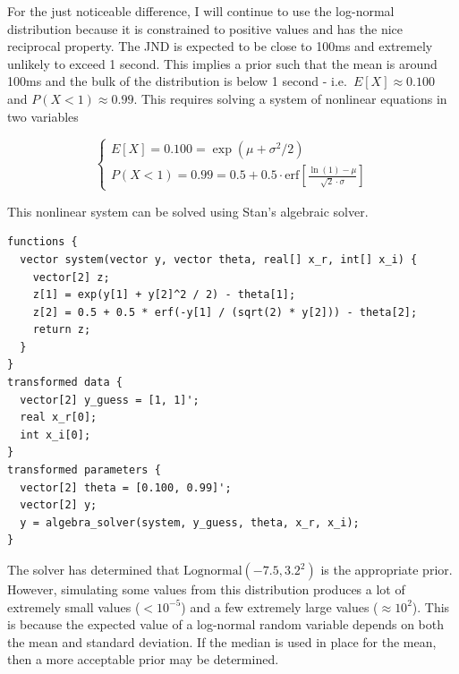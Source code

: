 \documentclass[11pt, oneside, openany]{scrbook}
\newenvironment{Shaded}{\begin{snugshade}}{\end{snugshade}}
\newcommand{\CommentTok}[1]{\textcolor[rgb]{0.56,0.35,0.01}{\textit{#1}}}
\newcommand{\DataTypeTok}[1]{\textcolor[rgb]{0.13,0.29,0.53}{#1}}
\newcommand{\DecValTok}[1]{\textcolor[rgb]{0.00,0.00,0.81}{#1}}
\newcommand{\KeywordTok}[1]{\textcolor[rgb]{0.13,0.29,0.53}{\textbf{#1}}}
\newcommand{\NormalTok}[1]{#1}
\newcommand{\OperatorTok}[1]{\textcolor[rgb]{0.81,0.36,0.00}{\textbf{#1}}}
\newcommand{\StringTok}[1]{\textcolor[rgb]{0.31,0.60,0.02}{#1}}
\begin{document}
For the just noticeable difference, I will continue to use the log-normal distribution because it is constrained to positive values and has the nice reciprocal property. The JND is expected to be close to 100ms and extremely unlikely to exceed 1 second. This implies a prior such that the mean is around 100ms and the bulk of the distribution is below 1 second - i.e.~\(E[X] \approx 0.100\) and \(P(X < 1) \approx 0.99\). This requires solving a system of nonlinear equations in two variables

\[
\begin{cases}
E[X] = 0.100 = \exp\left(\mu + \sigma^2 / 2\right) \\
P(X < 1) = 0.99 = 0.5 + 0.5 \cdot \mathrm{erf}\left[\frac{\ln (1) - \mu}{\sqrt{2} \cdot \sigma}\right]
\end{cases}
\]

This nonlinear system can be solved using Stan's algebraic solver.

\begin{verbatim}
functions {
  vector system(vector y, vector theta, real[] x_r, int[] x_i) {
    vector[2] z;
    z[1] = exp(y[1] + y[2]^2 / 2) - theta[1];
    z[2] = 0.5 + 0.5 * erf(-y[1] / (sqrt(2) * y[2])) - theta[2];
    return z;
  }
}
transformed data {
  vector[2] y_guess = [1, 1]';
  real x_r[0];
  int x_i[0];
}
transformed parameters {
  vector[2] theta = [0.100, 0.99]';
  vector[2] y;
  y = algebra_solver(system, y_guess, theta, x_r, x_i);
}
\end{verbatim}

\begin{Shaded}
\end{Shaded}

The solver has determined that \(\mathrm{Lognormal}(-7.5, 3.2^2)\) is the appropriate prior. However, simulating some values from this distribution produces a lot of extremely small values (\(<10^{-5}\)) and a few extremely large values (\(\approx 10^2\)). This is because the expected value of a log-normal random variable depends on both the mean and standard deviation. If the median is used in place for the mean, then a more acceptable prior may be determined.
\end{document}
